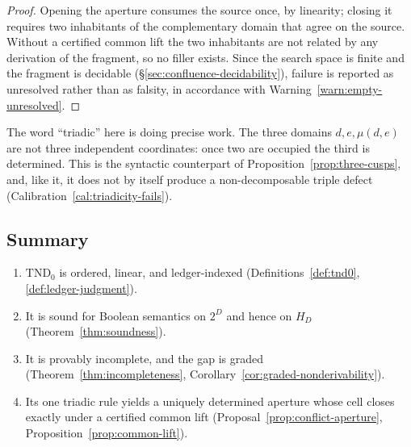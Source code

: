 \begin{proof}
Opening the aperture consumes the source once, by linearity; closing it requires two
inhabitants of the complementary domain that agree on the source.  Without a certified
common lift the two inhabitants are not related by any derivation of the fragment, so no
filler exists.  Since the search space is finite and the fragment is decidable
(\S\ref{sec:confluence-decidability}), failure is reported as unresolved rather than as
falsity, in accordance with Warning~\ref{warn:empty-unresolved}.
\end{proof}

\begin{remark}
The word ``triadic'' here is doing precise work.  The three domains $d,e,\mu(d,e)$ are not
three independent coordinates: once two are occupied the third is determined.  This is the
syntactic counterpart of Proposition~\ref{prop:three-cusps}, and, like it, it does not by
itself produce a non-decomposable triple defect
(Calibration~\ref{cal:triadicity-fails}).
\end{remark}

\subsection{Summary}

\begin{enumerate}
\item $\mathrm{TND}_0$ is ordered, linear, and ledger-indexed
  (Definitions~\ref{def:tnd0}, \ref{def:ledger-judgment}).
\item It is sound for Boolean semantics on $2^{D}$ and hence on $H_D$
  (Theorem~\ref{thm:soundness}).
\item It is provably incomplete, and the gap is graded
  (Theorem~\ref{thm:incompleteness}, Corollary~\ref{cor:graded-nonderivability}).
\item Its one triadic rule yields a uniquely determined aperture whose cell closes exactly
  under a certified common lift
  (Proposal~\ref{prop:conflict-aperture}, Proposition~\ref{prop:common-lift}).
\end{enumerate}

